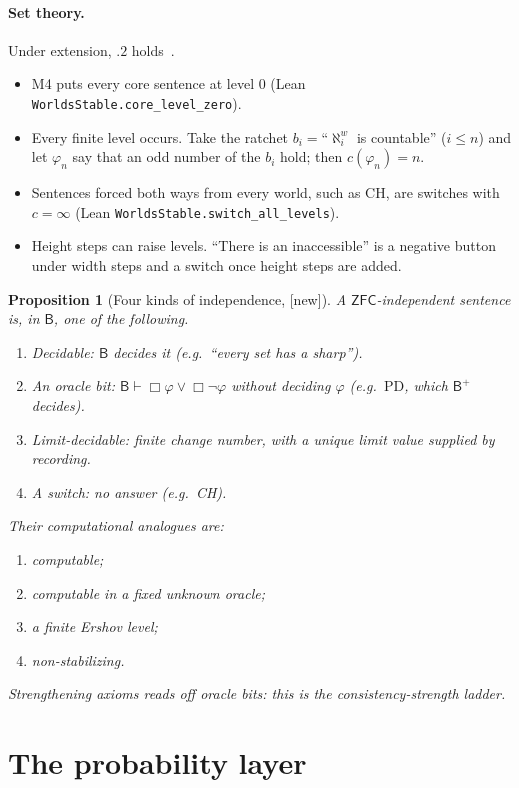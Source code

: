 \documentclass[11pt]{article}
\newtheorem{proposition}[theorem]{Proposition}
\theoremstyle{definition}
\theoremstyle{remark}
\newcommand{\B}{\mathsf{B}}
\newcommand{\Bp}{\mathsf{B}^{+}}
\newcommand{\ZFC}{\mathsf{ZFC}}
\newcommand{\lean}[1]{\texttt{#1}}
\newcommand{\status}[1]{\textsf{[#1]}}
\begin{document}
\paragraph{Set theory.} Under extension, $.2$ holds~\cite{HamkinsLowe08}.
\begin{itemize}
\item M4 puts every core sentence at level 0 (Lean \lean{WorldsStable.core\_level\_zero}).
\item Every finite level occurs. Take the ratchet $b_i=$``$\aleph^w_i$ is countable'' ($i\le n$) and let $\varphi_n$ say that an odd number of the $b_i$ hold; then $c(\varphi_n)=n$.
\item Sentences forced both ways from every world, such as CH, are switches with $c=\infty$ (Lean \lean{WorldsStable.switch\_all\_levels}).
\item Height steps can raise levels. ``There is an inaccessible'' is a negative button under width steps and a switch once height steps are added.
\end{itemize}

\begin{proposition}[Four kinds of independence, \status{new}]
A $\ZFC$-independent sentence is, in $\B$, one of the following.
\begin{enumerate}
\item \emph{Decidable}: $\B$ decides it (e.g.\ ``every set has a sharp'').
\item An \emph{oracle bit}: $\B\vdash\Box\varphi\vee\Box\neg\varphi$ without deciding $\varphi$ (e.g.\ $\mathrm{PD}$, which $\Bp$ decides).
\item \emph{Limit-decidable}: finite change number, with a unique limit value supplied by recording.
\item A \emph{switch}: no answer (e.g.\ CH).
\end{enumerate}
Their computational analogues are:
\begin{enumerate}
\item computable;
\item computable in a fixed unknown oracle;
\item a finite Ershov level;
\item non-stabilizing.
\end{enumerate}
Strengthening axioms reads off oracle bits: this is the consistency-strength ladder.
\end{proposition}

\section{The probability layer}\label{sec:prob}
\end{document}

